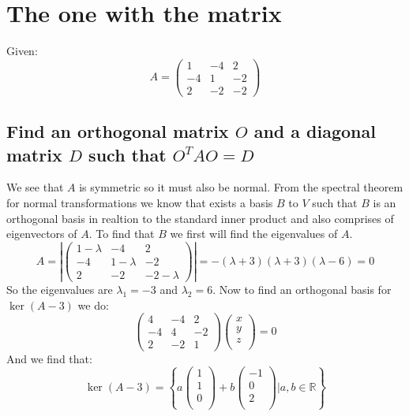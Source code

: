 \documentclass[11pt,a4paper]{article}
\theoremstyle{plain}
\newcommand{\R}{\mathbb{R}}
\begin{document}
	
	\newpage
	
	\section{The one with the matrix}
	Given:
	\[
	A = 
		\begin{pmatrix}
		1 & -4 & 2 \\
		-4 & 1 & -2 \\
		2 & -2 & -2 
		\end{pmatrix}
	\]
	\subsection{Find an orthogonal matrix $O$ and a diagonal matrix $D$ such
	that $O^{T}AO=D$}
	We see that $A$ is symmetric so it must also be normal. From the spectral
	theorem for normal transformations we know that exists a basis $B$ to $V$
	such that $B$ is an orthogonal basis in realtion to the standard inner
	product and also comprises of eigenvectors of $A$. To find that $B$ we
	first will find the eigenvalues of $A$.
	\[
	A = 
		\left\vert
		\begin{pmatrix}
		1-\lambda & -4 & 2 \\
		-4 & 1-\lambda & -2 \\
		2 & -2 & -2-\lambda 
		\end{pmatrix}
		\right\vert = -(\lambda+3)(\lambda+3)(\lambda-6) = 0
	\]
	So the eigenvalues are $\lambda_1 = -3$ and $\lambda_2=6$. Now to find
	an orthogonal basis for $\ker(A-3)$ we do:
	\[
		\begin{pmatrix}
		4 & -4 & 2 \\
		-4 & 4 & -2 \\
		2 & -2 & 1 
		\end{pmatrix}
		\begin{pmatrix}
		x \\ y \\ z \\
		\end{pmatrix} = 0
	\]
	And we find that:
	\[
		\ker(A-3) = 
		\left\{
		a\begin{pmatrix} 1\\ 1\\ 0\\ \end{pmatrix} + 
		b\begin{pmatrix} -1\\ 0\\ 2\\ \end{pmatrix}
		\biggr\vert a,b\in\R
		\right\}
	\]
\end{document}
